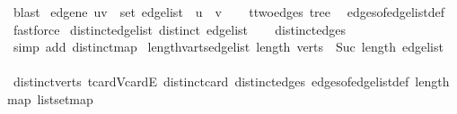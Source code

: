 \begin{isabellebody}
\ blast%
\endisatagproof
{\isafoldproof}%
%
\isadelimproof
%
\endisadelimproof
\isanewline
\isanewline
{}\isamarkupfalse%
\ edge{\isacharunderscore}{\kern0pt}ne{\isacharcolon}{\kern0pt}\ {\isachardoublequoteopen}{\isacharparenleft}{\kern0pt}u{\isacharcomma}{\kern0pt}v{\isacharparenright}{\kern0pt}\ {\isasymin}\ set\ edge{\isacharunderscore}{\kern0pt}list\ {\isasymLongrightarrow}\ u\ {\isasymnoteq}\ v{\isachardoublequoteclose}\isanewline
%
\isadelimproof
\ \ %
\endisadelimproof
%
\isatagproof
{}\isamarkupfalse%
\ t{\isachardot}{\kern0pt}two{\isacharunderscore}{\kern0pt}edges\ tree\ \isamarkupfalse%
\ edges{\isacharunderscore}{\kern0pt}of{\isacharunderscore}{\kern0pt}edge{\isacharunderscore}{\kern0pt}list{\isacharunderscore}{\kern0pt}def\ \isamarkupfalse%
\ fastforce%
\endisatagproof
{\isafoldproof}%
%
\isadelimproof
\isanewline
%
\endisadelimproof
\isanewline
{}\isamarkupfalse%
\ distinct{\isacharunderscore}{\kern0pt}edge{\isacharunderscore}{\kern0pt}list{\isacharcolon}{\kern0pt}\ {\isachardoublequoteopen}distinct\ edge{\isacharunderscore}{\kern0pt}list{\isachardoublequoteclose}\isanewline
%
\isadelimproof
\ \ %
\endisadelimproof
%
\isatagproof
{}\isamarkupfalse%
\ distinct{\isacharunderscore}{\kern0pt}edges\ \isamarkupfalse%
\ {\isacharparenleft}{\kern0pt}simp\ add{\isacharcolon}{\kern0pt}\ distinct{\isacharunderscore}{\kern0pt}map{\isacharparenright}{\kern0pt}%
\endisatagproof
{\isafoldproof}%
%
\isadelimproof
\isanewline
%
\endisadelimproof
\isanewline
{}\isamarkupfalse%
\ length{\isacharunderscore}{\kern0pt}varts{\isacharunderscore}{\kern0pt}edge{\isacharunderscore}{\kern0pt}list{\isacharcolon}{\kern0pt}\ {\isachardoublequoteopen}length\ verts\ {\isacharequal}{\kern0pt}\ Suc\ {\isacharparenleft}{\kern0pt}length\ edge{\isacharunderscore}{\kern0pt}list{\isacharparenright}{\kern0pt}{\isachardoublequoteclose}\isanewline
%
\isadelimproof
\ \ %
\endisadelimproof
%
\isatagproof
{}\isamarkupfalse%
\ distinct{\isacharunderscore}{\kern0pt}verts\ t{\isachardot}{\kern0pt}card{\isacharunderscore}{\kern0pt}V{\isacharunderscore}{\kern0pt}card{\isacharunderscore}{\kern0pt}E\ distinct{\isacharunderscore}{\kern0pt}card\ distinct{\isacharunderscore}{\kern0pt}edges\ edges{\isacharunderscore}{\kern0pt}of{\isacharunderscore}{\kern0pt}edge{\isacharunderscore}{\kern0pt}list{\isacharunderscore}{\kern0pt}def\ length{\isacharunderscore}{\kern0pt}map\ list{\isachardot}{\kern0pt}set{\isacharunderscore}{\kern0pt}map\ \isamarkupfalse%

\end{isabellebody}
